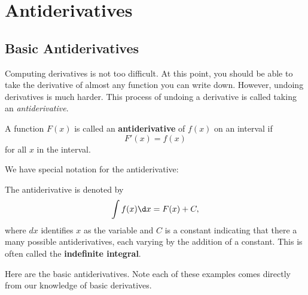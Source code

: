 \chapter{Antiderivatives}

\section{Basic Antiderivatives}

Computing derivatives is not too difficult. At this point, you should
be able to take the derivative of almost any function you can write
down. However, undoing derivatives is much harder. This process of
undoing a derivative is called taking an \textit{antiderivative}.

\begin{definition}
A function $F(x)$ is called an \textbf{antiderivative} of $f(x)$ on an
interval if
\[
F'(x) = f(x)
\]
for all $x$ in the interval.
\end{definition}

We have special notation for the antiderivative:

\begin{definition}
The antiderivative is denoted by
\[
\int f(x) \d x = F(x)+C,
\]
where $dx$ identifies $x$ as the variable and $C$ is a constant
indicating that there a many possible antiderivatives, each varying by
the addition of a constant.  This is often called the
\textbf{indefinite integral}.
\end{definition}

Here are the basic antiderivatives. Note each of these examples comes
directly from our knowledge of basic derivatives.


